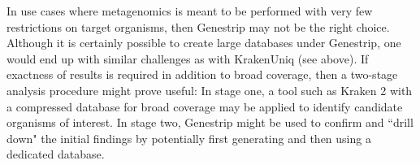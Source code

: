 \documentclass[pdflatex,sn-vancouver-num]{sn-jnl}
\begin{document}
    In use cases where metagenomics is meant to be performed with very few restrictions on target organisms, then Genestrip may not be the right choice. Although it is certainly possible to create large databases under Genestrip, one would end up with similar challenges as with KrakenUniq (see above). If exactness of results is required in addition to broad coverage, then a two-stage analysis procedure might prove useful: In stage one, a tool such as Kraken 2 with a compressed database for broad coverage may be applied to identify candidate organisms of interest. In stage two, Genestrip might be used to confirm and ``drill down" the initial findings by potentially first generating and then using a dedicated database.

%
\end{document}
